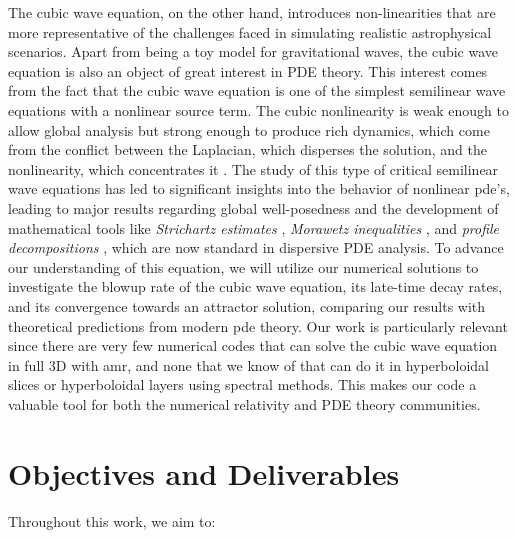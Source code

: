 The cubic wave equation, on the other hand, introduces non-linearities that are more representative of the challenges faced in simulating realistic astrophysical scenarios. Apart from being a toy model for gravitational waves, the cubic wave equation is also an object of great interest in PDE theory. This interest comes from the fact that the cubic wave equation is one of the simplest semilinear wave equations with a nonlinear source term. The cubic nonlinearity is weak enough to allow global analysis but strong enough to produce rich dynamics, which come from the conflict between the Laplacian, which disperses the solution, and the nonlinearity, which concentrates it \cite{Universality_of_global_dynamics_for_the_cubic_wave_equation}. The study of this type of critical semilinear wave equations has led to significant insights into the behavior of nonlinear \acrshort{pde}'s, leading to major results regarding global well-posedness \cite{global_well-posedness} and the development of mathematical tools like \textit{Strichartz estimates} \cite{Strichartz_estimates}, \textit{Morawetz inequalities} \cite{Morawetz_inequality}, and \textit{profile decompositions} \cite{profile_decomposition}, which are now standard in dispersive PDE analysis. To advance our understanding of this equation, we will utilize our numerical solutions to investigate the blowup rate of the cubic wave equation, its late-time decay rates, and its convergence towards an attractor solution, comparing our results with theoretical predictions from modern \acrshort{pde} theory. Our work is particularly relevant since there are very few numerical codes that can solve the cubic wave equation in full 3D with \acrshort{amr}, and none that we know of that can do it in hyperboloidal slices or hyperboloidal layers using spectral methods. This makes our code a valuable tool for both the numerical relativity and PDE theory communities.

\clearpage
\section{Objectives and Deliverables}
\label{section:objectives}

Throughout this work, we aim to:

